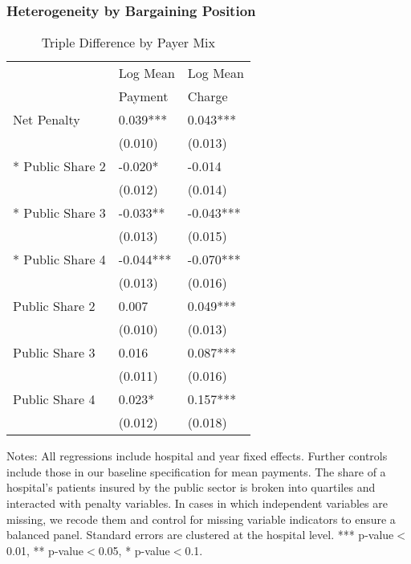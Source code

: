 \documentclass{beamer}
\begin{document}
\begin{frame}
\frametitle{Heterogeneity by Bargaining Position}
\begin{table}[htp]
\centering \normalsize
\caption{Triple Difference by Payer Mix}
\scriptsize
\begin{tabular}{lll}
\hline	
 		& Log Mean & Log Mean   				 \\
		& Payment & Charge\\
\hline \hline
Net Penalty	& 0.039*** & 0.043*** 	\\
	&	(0.010) & (0.013)	\\
\hspace{0.1in}* Public Share 2 & -0.020* & -0.014	\\
	&	(0.012) & (0.014) 	\\
\hspace{0.1in}* Public Share 3 & -0.033** & -0.043***	\\
	&	(0.013) & (0.015) 	\\
\hspace{0.1in}* Public Share 4 & -0.044*** & -0.070***	\\
	&	(0.013) & (0.016)	\\
Public Share 2 & 0.007 & 0.049***	\\
	&	(0.010) & (0.013)	\\
Public Share 3 & 0.016 & 0.087***	\\
	&	(0.011) & (0.016) 	\\
Public Share 4 & 0.023* & 0.157***	\\
	&	(0.012) & (0.018)	\\
\hline
\end{tabular}
\end{table}
\tiny Notes: All regressions include hospital and year ﬁxed eﬀects. Further controls include those in our baseline speciﬁcation for mean payments. The share of a hospital’s patients insured by the public sector is broken into quartiles and interacted with penalty variables. In cases in which independent variables are missing, we recode them and control for missing variable indicators to ensure a balanced panel. Standard errors are clustered at the hospital level. *** p-value$<$0.01, ** p-value$<$0.05, * p-value$<$0.1.
\end{frame}
\end{document}
